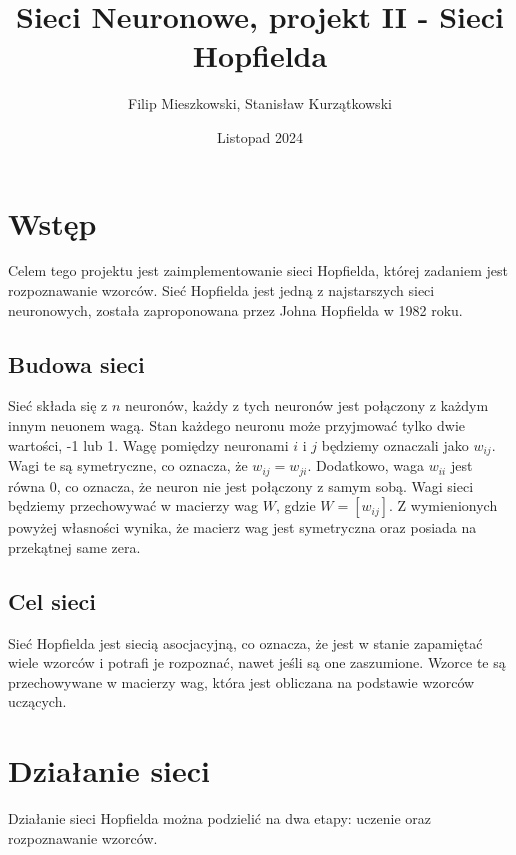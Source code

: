 \documentclass{article}
\title{Sieci Neuronowe, projekt II - Sieci Hopfielda}
\author{Filip Mieszkowski, Stanisław Kurzątkowski}
\date{Listopad 2024}
\begin{document}
\maketitle

\section{Wstęp}
Celem tego projektu jest zaimplementowanie sieci Hopfielda, której zadaniem jest rozpoznawanie wzorców. 
Sieć Hopfielda jest jedną z najstarszych sieci neuronowych, została zaproponowana przez Johna Hopfielda w 1982 roku. 

\subsection{Budowa sieci}
Sieć składa się z $n$ neuronów, każdy z tych neuronów jest połączony z każdym innym neuonem wagą. 
Stan każdego neuronu może przyjmować tylko dwie wartości, -1 lub 1.
Wagę pomiędzy neuronami $i$ i $j$ będziemy oznaczali jako $w_{ij}$.
Wagi te są symetryczne, co oznacza, że $w_{ij} = w_{ji}$. 
Dodatkowo, waga $w_{ii}$ jest równa 0, co oznacza, że neuron nie jest połączony z samym sobą.
Wagi sieci będziemy przechowywać w macierzy wag $W$, gdzie $W = [w_{ij}]$.
Z wymienionych powyżej własności wynika, że macierz wag jest symetryczna oraz posiada na przekątnej same zera.


\subsection{Cel sieci}
Sieć Hopfielda jest siecią asocjacyjną, co oznacza, że jest w stanie zapamiętać wiele wzorców i potrafi je rozpoznać, 
nawet jeśli są one zaszumione. Wzorce te są przechowywane w macierzy wag, która jest obliczana na podstawie wzorców uczących.


\section{Działanie sieci}
Działanie sieci Hopfielda można podzielić na dwa etapy: uczenie oraz rozpoznawanie wzorców.
\end{document}
